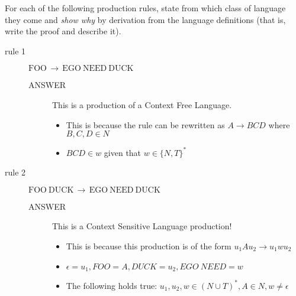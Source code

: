 \documentclass[11pt]{article}
\newcommand{\txtgrmr}[2]{\ensuremath{\mathrm{#1} \,\longrightarrow\, \mathrm{#2}}}
\begin{document}
For each of the following production rules, state from which class of
language they come and \emph{show why} by derivation from the language
definitions (that is, write the proof and describe it).
\begin{description}
\item[{rule 1}] \(\txtgrmr{FOO}{EGO \ NEED \ DUCK}\)
\begin{description}
\item[{ANSWER}] This is a production of a Context Free Language.
\begin{itemize}
\item This is because the rule can be rewritten as \(A \rightarrow BCD\) where \(B,C,D \in N\)
\item \(BCD \in w\) given that \(w \in \{N,T\}^*\)
\end{itemize}
\end{description}
\item[{rule 2}] \(\txtgrmr{FOO \ DUCK}{EGO \ NEED \ DUCK}\)
\begin{description}
\item[{ANSWER}] This is a Context Sensitive Language production!
\begin{itemize}
\item This is because this production is of the form \(u_1 A u_2 \rightarrow u_1 w u_2\)
\item \(\epsilon = u_1, FOO = A, DUCK = u_2, EGO\ NEED = w\)
\item The following holds true: \(u_1, u_2, w \in (N \cup T)^*, A \in N, w \neq \epsilon\)
\end{itemize}
\end{description}
\end{description}
\end{document}
